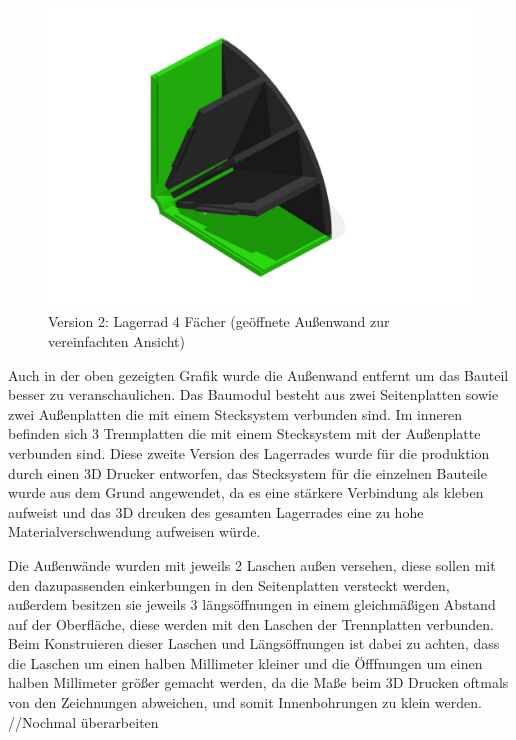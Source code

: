\begin{figure}[H]
    \centering
    \includegraphics[scale=0.5,page=1]{fig/mech/LagerRad4F}
    \caption{Version 2: Lagerrad 4 Fächer (geöffnete Außenwand zur vereinfachten Ansicht)}
\end{figure}

Auch in der oben gezeigten Grafik wurde die Außenwand entfernt um das Bauteil besser zu veranschaulichen. Das Baumodul besteht aus zwei Seitenplatten sowie zwei Außenplatten die
mit einem Stecksystem verbunden sind. Im inneren befinden sich 3 Trennplatten die mit einem Stecksystem mit der Außenplatte verbunden sind. Diese zweite Version des Lagerrades wurde für die produktion durch einen 3D Drucker
entworfen, das Stecksystem für die einzelnen Bauteile wurde aus dem Grund angewendet, da es eine stärkere Verbindung als kleben aufweist und das 3D drcuken des gesamten Lagerrades eine zu hohe Materialverschwendung aufweisen würde.

Die Außenwände wurden mit jeweils 2 Laschen außen versehen, diese sollen mit den dazupassenden einkerbungen in den Seitenplatten versteckt werden, außerdem besitzen sie jeweils 3 längsöffnungen in einem gleichmäßigen Abstand auf der Oberfläche,
diese werden mit den Laschen der Trennplatten verbunden. Beim Konstruieren dieser Laschen und Längsöffnungen ist dabei zu achten, dass die Laschen um einen halben Millimeter kleiner und die Öfffnungen um einen halben Millimeter größer gemacht werden,
da die Maße beim 3D Drucken oftmals von den Zeichnungen abweichen, und somit Innenbohrungen zu klein werden. //Nochmal überarbeiten


